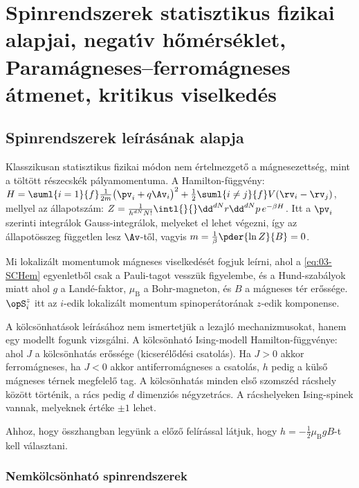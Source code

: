 \chapter{Spinrendszerek statisztikus fizikai alapjai, negat\'{\i}v h\H{o}m\'ers\'eklet, Pa\-ra\-m\'ag\-ne\-ses--fer\-ro\-m\'ag\-ne\-ses \'at\-me\-net, kritikus viselked\'es}
 
 \section{Spinrendszerek leírásának alapja}
  
  Klasszikusan statisztikus fizikai módon nem értelmezgető a mágnesezettség, mint a töltött részecskék pályamomentuma.
   A Hamilton-függvény: $H=\suml{i=1}{f}\frac{1}{2m}\big(\pv_i+q\Av_i\big)^2+\frac{1}{2}\suml{i\ne j}{f}V(\rv_i-\rv_j)$, mellyel az állapotszám: $Z=\frac{1}{h^{dN}N!}\intl{}{}\dd^{dN}r\dd^{dN}p\,e^{-\beta H}$.
   Itt a $\pv_i$ szerinti integrálok Gauss-integrálok, melyeket el lehet végezni, így az állapotösszeg független lesz $\Av$-től, vagyis $m=\frac{1}{\beta}\pder{\ln Z}{B}=0$.
  
  Mi lokalizált momentumok mágneses viselkedését fogjuk leírni, ahol a \eqref{eq:03-SCHem} egyenletből csak a Pauli-tagot vesszük figyelembe, és a Hund-szabályok miatt
   ahol $g$ a Landé-faktor, $\mu_\text{B}$ a Bohr-magneton, és $B$ a mágneses tér erőssége. $\opS^z_i$ itt az $i$-edik lokalizált momentum spinoperátorának $z$-edik komponense.
  
  A kölcsönhatások leírásához nem ismertetjük a lezajló mechanizmusokat, hanem egy modellt fogunk vizsgálni.
   A kölcsönható Ising-modell Hamilton-függvénye:
  ahol $J$ a kölcsönhatás erőssége (kicserélődési csatolás).
   Ha $J>0$ akkor ferromágneses, ha $J<0$ akkor antiferromágneses a csatolás, $h$ pedig a külső mágneses térnek megfelelő tag.
   A kölcsönhatás minden első szomszéd rácshely között történik, a rács pedig $d$ dimenziós négyzetrács.
   A rácshelyeken Ising-spinek vannak, melyeknek értéke $\pm1$ lehet. 
  
  Ahhoz, hogy összhangban legyünk a előző felírással látjuk, hogy $h=-\frac{1}{2}\mu_\text{B}gB$-t kell választani.
  
  \subsection{Nemkölcsönható spinrendszerek}
   

